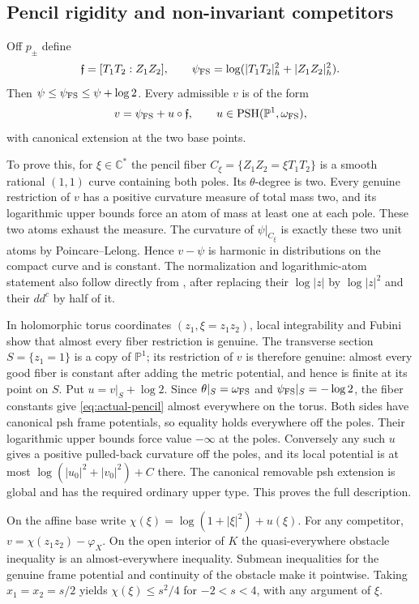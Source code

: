 \documentclass[11pt]{article}
\newcommand{\ddc}{dd^c}
\newcommand{\C}{\mathbb C}
\newcommand{\PSH}{\operatorname{PSH}}
\begin{document}
\subsection{Pencil rigidity and non-invariant competitors}
Off $p_\pm$ define
\[
 \mathfrak f=[T_1T_2:Z_1Z_2],\qquad
 \psi_{\rm FS}=\log(|T_1T_2|_h^2+|Z_1Z_2|_h^2).
\]
Then $\psi\leq\psi_{\rm FS}\leq\psi+\log2$.
Every admissible $v$ is of the form
\begin{equation}\label{eq:actual-pencil}
 v=\psi_{\rm FS}+u\circ\mathfrak f,\qquad
                   u\in\PSH(\mathbb P^1,\omega_{\rm FS}),
\end{equation}
with canonical extension at the two base points.

To prove this, for $\xi\in\C^*$ the pencil fiber
$C_\xi=\{Z_1Z_2=\xi T_1T_2\}$ is a smooth rational $(1,1)$
curve containing both poles. Its $\theta$-degree is two.
Every genuine restriction of $v$ has a positive curvature measure
of total mass two, and its logarithmic upper bounds force an atom
of mass at least one at each pole. These two atoms exhaust the
measure. The curvature of $\psi|_{C_\xi}$ is exactly these two
unit atoms by Poincare--Lelong. Hence $v-\psi$ is harmonic in
distributions on the compact curve and is constant.
The normalization and logarithmic-atom statement also follow directly
from \cite[III, Sections 2.C and 6]{DemaillyBook}, after replacing
their $\log|z|$ by $\log|z|^2$ and their $\ddc$ by half of it.

In holomorphic torus coordinates $(z_1,\xi=z_1z_2)$, local
integrability and Fubini show that almost every fiber restriction
is genuine. The transverse section $S=\{z_1=1\}$ is a copy of
$\mathbb P^1$; its restriction of $v$ is therefore genuine: almost every good fiber is constant after adding
the metric potential, and hence is finite at its point on $S$.
Put $u=v|_S+\log2$. Since $\theta|_S=\omega_{\rm FS}$ and
$\psi_{\rm FS}|_S=-\log2$, the fiber constants give
\eqref{eq:actual-pencil} almost everywhere on the torus. Both
sides have canonical psh frame potentials, so equality holds
everywhere off the poles. Their logarithmic upper bounds force
value $-\infty$ at the poles. Conversely any such $u$ gives a
positive pulled-back curvature off the poles, and its local
potential is at most $\log(|u_0|^2+|v_0|^2)+C$ there. The
canonical removable psh extension is global and has the required
ordinary upper type. This proves the full description.

On the affine base write $\chi(\xi)=\log(1+|\xi|^2)+u(\xi)$.
For any competitor, $v=\chi(z_1z_2)-\varphi_X$. On the open
interior of $K$ the quasi-everywhere obstacle inequality is an
almost-everywhere inequality. Submean inequalities for the genuine
frame potential and continuity of the obstacle make it pointwise.
Taking $x_1=x_2=s/2$ yields $\chi(\xi)\leq s^2/4$ for
$-2<s<4$, with any argument of $\xi$.
\end{document}
